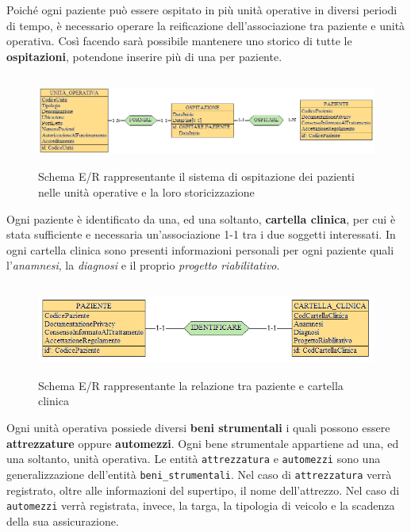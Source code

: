 \documentclass[a4paper, 12pt]{report}
\begin{document}
\noindent
Poiché ogni paziente può essere ospitato in più unità operative in diversi periodi di tempo, è necessario operare la reificazione
dell'associazione tra paziente e unità operativa. Così facendo sarà possibile mantenere uno storico di tutte le \textbf{ospitazioni},
potendone inserire più di una per paziente.

\begin{figure}[H]
        \centering
        \includegraphics[height=3cm]{img/pazienteOspitazionePostReif.png}
        \caption{Schema E/R rappresentante il sistema di ospitazione dei pazienti nelle unità operative e la loro storicizzazione}
\end{figure}

\noindent
Ogni paziente è identificato da una, ed una soltanto, \textbf{cartella clinica}, per cui è stata sufficiente e necessaria un'associazione
1-1 tra i due soggetti interessati. In ogni cartella clinica sono presenti informazioni personali per ogni paziente quali l'\textit{anamnesi},
la \textit{diagnosi} e il proprio \textit{progetto riabilitativo}. 

\begin{figure}[H]
        \centering
        \includegraphics[height=3cm]{img/pazienteCartella.png}
        \caption{Schema E/R rappresentante la relazione tra paziente e cartella clinica}
\end{figure}

\noindent
Ogni unità operativa possiede diversi \textbf{beni strumentali} i quali possono essere \textbf{attrezzature} oppure \textbf{automezzi}.
Ogni bene strumentale appartiene ad una, ed una soltanto, unità operativa. Le entità \texttt{attrezzatura} e \texttt{automezzi} sono una generalizzazione
dell'entità \texttt{beni\_strumentali}. Nel caso di \texttt{attrezzatura} verrà registrato, oltre alle informazioni del supertipo, il nome dell'attrezzo.
Nel caso di \texttt{automezzi} verrà registrata, invece, la targa, la tipologia di veicolo e la scadenza della sua assicurazione.
\end{document}
